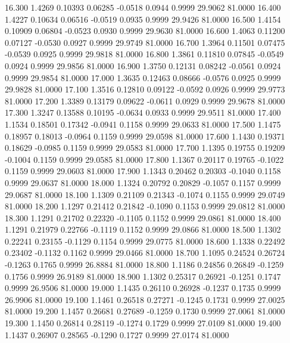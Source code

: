   16.300   1.4269   0.10393   0.06285  -0.0518   0.0944   0.9999  29.9062  81.0000
  16.400   1.4227   0.10634   0.06516  -0.0519   0.0935   0.9999  29.9426  81.0000
  16.500   1.4154   0.10909   0.06804  -0.0523   0.0930   0.9999  29.9630  81.0000
  16.600   1.4063   0.11200   0.07127  -0.0530   0.0927   0.9999  29.9749  81.0000
  16.700   1.3964   0.11501   0.07475  -0.0539   0.0925   0.9999  29.9818  81.0000
  16.800   1.3861   0.11810   0.07845  -0.0549   0.0924   0.9999  29.9856  81.0000
  16.900   1.3750   0.12131   0.08242  -0.0561   0.0924   0.9999  29.9854  81.0000
  17.000   1.3635   0.12463   0.08666  -0.0576   0.0925   0.9999  29.9828  81.0000
  17.100   1.3516   0.12810   0.09122  -0.0592   0.0926   0.9999  29.9773  81.0000
  17.200   1.3389   0.13179   0.09622  -0.0611   0.0929   0.9999  29.9678  81.0000
  17.300   1.3247   0.13588   0.10195  -0.0634   0.0933   0.9999  29.9511  81.0000
  17.400   1.1534   0.18501   0.17342  -0.0941   0.1158   0.9999  29.0633  81.0000
  17.500   1.1475   0.18957   0.18013  -0.0964   0.1159   0.9999  29.0598  81.0000
  17.600   1.1430   0.19371   0.18629  -0.0985   0.1159   0.9999  29.0583  81.0000
  17.700   1.1395   0.19755   0.19209  -0.1004   0.1159   0.9999  29.0585  81.0000
  17.800   1.1367   0.20117   0.19765  -0.1022   0.1159   0.9999  29.0603  81.0000
  17.900   1.1343   0.20462   0.20303  -0.1040   0.1158   0.9999  29.0637  81.0000
  18.000   1.1324   0.20792   0.20829  -0.1057   0.1157   0.9999  29.0687  81.0000
  18.100   1.1309   0.21109   0.21343  -0.1074   0.1155   0.9999  29.0749  81.0000
  18.200   1.1297   0.21412   0.21842  -0.1090   0.1153   0.9999  29.0812  81.0000
  18.300   1.1291   0.21702   0.22320  -0.1105   0.1152   0.9999  29.0861  81.0000
  18.400   1.1291   0.21979   0.22766  -0.1119   0.1152   0.9999  29.0866  81.0000
  18.500   1.1302   0.22241   0.23155  -0.1129   0.1154   0.9999  29.0775  81.0000
  18.600   1.1338   0.22492   0.23402  -0.1132   0.1162   0.9999  29.0466  81.0000
  18.700   1.1095   0.24524   0.26724  -0.1263   0.1765   0.9999  26.8884  81.0000
  18.800   1.1186   0.24856   0.26849  -0.1259   0.1756   0.9999  26.9189  81.0000
  18.900   1.1302   0.25317   0.26921  -0.1251   0.1747   0.9999  26.9506  81.0000
  19.000   1.1435   0.26110   0.26928  -0.1237   0.1735   0.9999  26.9906  81.0000
  19.100   1.1461   0.26518   0.27271  -0.1245   0.1731   0.9999  27.0025  81.0000
  19.200   1.1457   0.26681   0.27689  -0.1259   0.1730   0.9999  27.0061  81.0000
  19.300   1.1450   0.26814   0.28119  -0.1274   0.1729   0.9999  27.0109  81.0000
  19.400   1.1437   0.26907   0.28565  -0.1290   0.1727   0.9999  27.0174  81.0000

